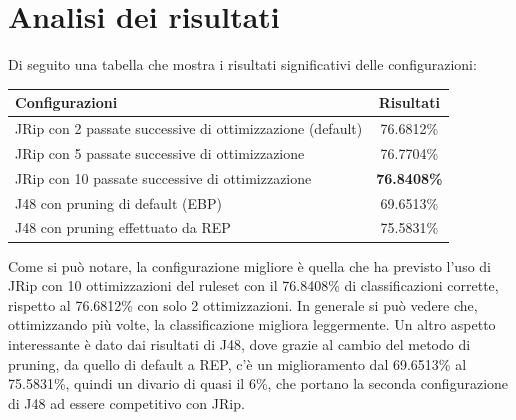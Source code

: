 \section{Analisi dei risultati}
Di seguito una tabella che mostra i risultati significativi delle configurazioni:

\begin{center}
\begin{tabular}{|l|c|}
	\hline
	\textbf{Configurazioni} & \textbf{Risultati} \\ \hline
	JRip con 2 passate successive di ottimizzazione (default) & 76.6812\% \\ \hline
	JRip con 5 passate successive di ottimizzazione & 76.7704\% \\ \hline
	JRip con 10 passate successive di ottimizzazione & \textbf{76.8408\%} \\ \hline
	J48 con pruning di default (EBP) & 69.6513\% \\ \hline
	J48 con pruning effettuato da REP & 75.5831\% \\ \hline
\end{tabular}
\end{center}

Come si può notare, la configurazione migliore è quella che ha previsto l'uso di JRip con 10 ottimizzazioni del ruleset con il 76.8408\% di classificazioni corrette, rispetto al 76.6812\% con solo 2 ottimizzazioni. In generale si può vedere che, ottimizzando più volte, la classificazione migliora leggermente.
Un altro aspetto interessante è dato dai risultati di J48, dove grazie al cambio del metodo di pruning, da quello di default a REP, c'è un miglioramento dal 69.6513\% al 75.5831\%, quindi un divario di quasi il 6\%, che portano la seconda configurazione di J48 ad essere competitivo con JRip.